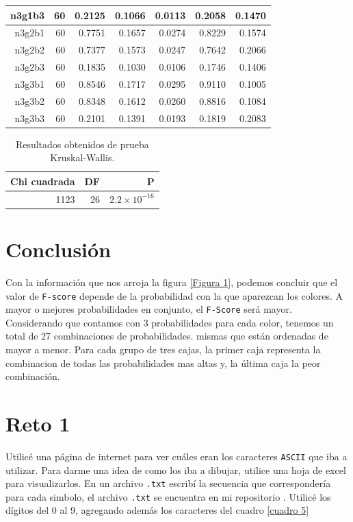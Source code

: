 \documentclass{article}
\begin{document}
\begin{table}[htb]
\begin{tabular}{|r|r|r|r|r|r|r|}
    \hline
    n3g1b3 & 60 & 0.2125 & 0.1066 & 0.0113 & 0.2058 & 0.1470 \\
    \hline
    n3g2b1 & 60 & 0.7751 & 0.1657 & 0.0274 & 0.8229 & 0.1574 \\
    \hline
    n3g2b2 & 60 & 0.7377 & 0.1573 & 0.0247 & 0.7642 & 0.2066 \\
    \hline
    n3g2b3 & 60 & 0.1835 & 0.1030 & 0.0106 & 0.1746 & 0.1406 \\
    \hline
    n3g3b1 & 60 & 0.8546 & 0.1717 & 0.0295 & 0.9110 & 0.1005 \\
    \hline
    n3g3b2 & 60 & 0.8348 & 0.1612 & 0.0260 & 0.8816 & 0.1084 \\
    \hline
    n3g3b3 & 60 & 0.2101 & 0.1391 & 0.0193 & 0.1819 & 0.2083 \\
    \hline
\end{tabular}
    \label{cuadro 3}
\end{table}

\begin{table}[ht]
    \centering
    \caption{Resultados obtenidos de prueba Kruskal-Wallis.} 
    \begin{tabular}{|r|r|r|}
    \hline
    Chi cuadrada & DF & P  \\
    \hline
    1123 & 26 & $2.2\times 10^{-16}$ \\
    \hline
\end{tabular}
    \label{cuadro 4}
\end{table}





\section{Conclusi\'on}
Con la informaci\'on que nos arroja la figura \ref{Figura 1}, podemos concluir que el valor de \texttt{F-score} depende de la probabilidad con la que aparezcan los colores. \newline
A mayor o mejores probabilidades en conjunto, el \texttt{F-Score}  ser\'a mayor.
Considerando que contamos con 3 probabilidades para cada color, tenemos un total de 27 combinaciones de probabilidades. mismas que est\'an ordenadas de mayor a menor. Para cada grupo de tres cajas, la primer caja representa la combinacion de todas las probabilidades mas altas y, la \'ultima caja la peor combinaci\'on.



\section{Reto 1}
Utilic\'e una p\'agina de internet \cite{ASCII} para ver cu\'ales eran los caracteres \texttt{ASCII} que iba a utilizar. Para darme una idea de como los iba a dibujar, utilice una hoja de excel para visualizarlos.
En un archivo \texttt{.txt} escrib\'i la secuencia que corresponder\'ia para cada simbolo, el archivo \texttt{.txt} se encuentra en mi repositorio \cite{mitxt}.
Utilic\'e los d\'igitos del 0 al 9, agregando adem\'as los caracteres del cuadro \ref{cuadro 5}
\end{document}
